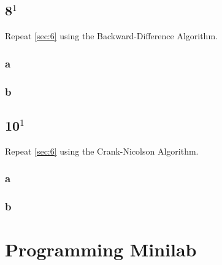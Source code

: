 \documentclass[12pt]{article}
\begin{document}
\subsection{8$^1$}
Repeat \cref{sec:6} using the Backward-Difference Algorithm.

\subsubsection{a}
\subsubsection{b}
\subsection{10$^1$}
Repeat \cref{sec:6} using the Crank-Nicolson Algorithm.
\subsubsection{a}
\subsubsection{b}
\section{Programming Minilab}
\end{document}

